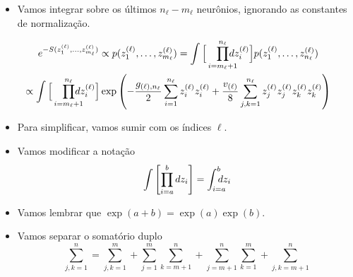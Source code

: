 \documentclass{beamer}
\def\eell{{(\ell)}}
\begin{document}
\begin{frame}
	\begin{itemize}
		\item Vamos integrar sobre os últimos $n_\ell - m_\ell$ neurônios, ignorando as constantes de normalização.
	\end{itemize}\small
	\begin{multline*}
		e^{-S(z_1^\eell, \ldots, z_{m_\ell}^\eell)} \propto p(z_1^\eell, \ldots, z_{m_\ell}^\eell ) = \int\Big[\prod_{i=m_\ell+1}^{n_\ell} \hspace*{-10pt}dz_i^\eell\Big] p(z_1^\eell, \ldots, z_{n_\ell}^\eell ) \\ 
		\propto \int\Big[\prod_{i=m_\ell+1}^{n_\ell} \hspace*{-10pt}dz_i^\eell\Big] \exp\left(-\frac{g_{\eell,n_\ell}}{2}\sum_{i=1}^{n_\ell}  z_i^\eell z_i^\eell + \frac{v_{\eell}}{8}\sum_{j,k=1}^{n_\ell}  z_j^\eell z_j^\eell z_k^\eell z_k^\eell\right)\\
	\end{multline*}
\end{frame}

\begin{frame}
	\begin{itemize}
		\item Para simplificar, vamos sumir com os índices $\ell$.
		\item Vamos modificar a notação $$\int \left[\prod_{i=a}^b dz_i\right] = \int_{i=a}^b \hspace{-10pt}dz_i$$
		\item Vamos lembrar que $\exp(a+b) = \exp(a)\exp(b)$.
		\item Vamos separar o somatório duplo $$\sum_{j,k=1}^n = \sum_{j,k=1}^{m} + \sum_{j=1}^{m}\sum_{k=m+1}^n + \sum_{j=m+1}^n\sum_{k=1}^{m} + \sum_{j,k=m+1}^n$$
	\end{itemize}
\end{frame}
\end{document}
